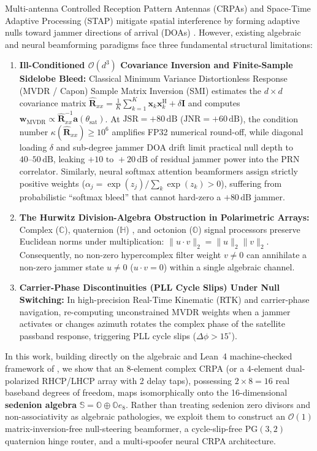 \documentclass[11pt,a4paper]{article}
\theoremstyle{definition}
\theoremstyle{remark}
\newcommand{\C}{\mathbb{C}}
\newcommand{\Ha}{\mathbb{H}}
\newcommand{\Oc}{\mathbb{O}}
\newcommand{\Se}{\mathbb{S}}
\newcommand{\PG}{\mathrm{PG}}
\begin{document}
Multi-antenna Controlled Reception Pattern Antennas (CRPAs) and Space-Time Adaptive Processing (STAP) mitigate spatial interference by forming adaptive nulls toward jammer directions of arrival (DOAs) \cite{VanTrees2002,Compton1988}. However, existing algebraic and neural beamforming paradigms face three fundamental structural limitations:
\begin{enumerate}
    \item \textbf{Ill-Conditioned $\mathcal{O}(d^3)$ Covariance Inversion and Finite-Sample Sidelobe Bleed:} Classical Minimum Variance Distortionless Response (MVDR / Capon) Sample Matrix Inversion (SMI) estimates the $d \times d$ covariance matrix $\hat{\bm{R}}_{xx} = \frac{1}{K}\sum_{k=1}^K \bm{x}_k \bm{x}_k^{\mathrm{H}} + \delta \bm{I}$ and computes $\bm{w}_{\mathrm{MVDR}} \propto \hat{\bm{R}}_{xx}^{-1}\bm{a}(\theta_{\mathrm{sat}})$. At $\mathrm{JSR} = +80\,\mathrm{dB}$ ($\mathrm{JNR} = +60\,\mathrm{dB}$), the condition number $\kappa(\hat{\bm{R}}_{xx}) \ge 10^6$ amplifies FP32 numerical round-off, while diagonal loading $\delta$ and sub-degree jammer DOA drift limit practical null depth to $40\text{--}50\,\mathrm{dB}$, leaking $+10\text{ to }+20\,\mathrm{dB}$ of residual jammer power into the PRN correlator. Similarly, neural softmax attention beamformers assign strictly positive weights ($\alpha_j = \exp(z_j)/\sum_k \exp(z_k) > 0$), suffering from probabilistic ``softmax bleed'' that cannot hard-zero a $+80\,\mathrm{dB}$ jammer.
    \item \textbf{The Hurwitz Division-Algebra Obstruction in Polarimetric Arrays:} Complex ($\C$), quaternion ($\Ha$) \cite{Bihan2004}, and octonion ($\Oc$) signal processors preserve Euclidean norms under multiplication: $\|u \cdot v\|_2 = \|u\|_2 \|v\|_2$. Consequently, no non-zero hypercomplex filter weight $v \neq 0$ can annihilate a non-zero jammer state $u \neq 0$ ($u \cdot v = 0$) within a single algebraic channel.
    \item \textbf{Carrier-Phase Discontinuities (PLL Cycle Slips) Under Null Switching:} In high-precision Real-Time Kinematic (RTK) and carrier-phase navigation, re-computing unconstrained MVDR weights when a jammer activates or changes azimuth rotates the complex phase of the satellite passband response, triggering PLL cycle slips ($\Delta\phi > 15^\circ$).
\end{enumerate}

In this work, building directly on the algebraic and Lean~4 machine-checked framework of \cite{Agourakis2026PG32}, we show that an 8-element complex CRPA (or a 4-element dual-polarized RHCP/LHCP array with 2 delay taps), possessing $2 \times 8 = 16$ real baseband degrees of freedom, maps isomorphically onto the 16-dimensional \textbf{sedenion algebra} $\Se = \Oc \oplus \Oc e_8$. Rather than treating sedenion zero divisors and non-associativity as algebraic pathologies, we exploit them to construct an $\mathcal{O}(1)$ matrix-inversion-free null-steering beamformer, a cycle-slip-free $\PG(3,2)$ quaternion hinge router, and a multi-spoofer neural CRPA architecture.
\end{document}
